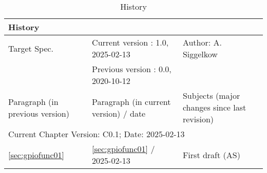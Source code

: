 \begin{table}[H]
\caption{History}
\label{tab:gpiohistory02}
\centering
\begin{tabularx}{\textwidth}{|X |X |X |}
  \hline
  \multicolumn{3}{|l|}{History} \\
  \hline
  \multicolumn{1}{|l}{Target Spec.} & \multicolumn{1}{l}{Current version : 1.0, 2025-02-13} & \multicolumn{1}{l|}{Author: A. Siggelkow}\\
  \multicolumn{1}{|l}{ } & \multicolumn{1}{l}{Previous version : 0.0, 2020-10-12} & \multicolumn{1}{l|}{ }\\
  \hline
  \hline
  Paragraph (in previous version) & Paragraph (in current version) / date & Subjects (major changes since last revision) \\
  \hline
  \hline
  \multicolumn{3}{|l|}{Current Chapter Version: C0.1; Date: 2025-02-13} \\
  \hline
  \ref{sec:gpiofunc01} & \ref{sec:gpiofunc01} / 2025-02-13 & First draft (AS) \\
  \hline
\end{tabularx}
\end{table}
